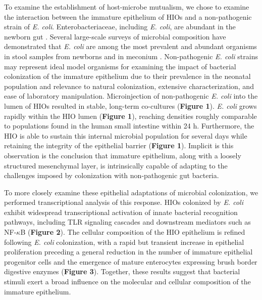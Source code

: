 \documentclass[9pt,lineo]{elife}
\begin{document}
To examine the establishment of host-microbe mutualism, we chose to examine the interaction between the immature epithelium of HIOs and a non-pathogenic strain of \emph{E. coli}. Enterobacteriaceae, including \emph{E. coli}, are abundant in the newborn gut \citep{Palmer:2007,Koenig:2011,Backhed:2015,Yassour:2016}. Several large-scale surveys of microbial composition have demonstrated that \emph{E. coli} are among the most prevalent and abundant organisms in stool samples from newborns \citep{Backhed:2015,Koenig:2011} and in meconium \citep{Gosalbes:2013}. Non-pathogenic \emph{E. coli} strains may represent ideal model organisms for examining the impact of bacterial colonization of the immature epithelium due to their prevalence in the neonatal population and relevance to natural colonization, extensive characterization, and ease of laboratory manipulation. Microinjection of non-pathogenic \emph{E. coli} into the lumen of HIOs resulted in stable, long-term co-cultures (\textbf{Figure 1}). \emph{E. coli} grows rapidly within the HIO lumen (\textbf{Figure 1}), reaching densities roughly comparable to populations found in the human small intestine \citep{Donaldson:2016} within 24 h. Furthermore, the HIO is able to sustain this internal microbial population for several days while retaining the integrity of the epithelial barrier (\textbf{Figure 1}). Implicit is this observation is the conclusion that immature epithelium, along with a loosely structured mesenchymal layer, is intrinsically capable of adapting to the challenges imposed by colonization with non-pathogenic gut bacteria. 

To more closely examine these epithelial adaptations of microbial colonization, we performed transcriptional analysis of this response. HIOs colonized by \emph{E. coli} exhibit widespread transcriptional activation of innate bacterial recognition pathways, including TLR signaling cascades and downstream mediators such as NF-\(\kappa\)B (\textbf{Figure 2}). The cellular composition of the HIO epithelium is refined following \emph{E. coli} colonization, with a rapid but transient increase in epithelial proliferation preceding a general reduction in the number of immature epithelial progenitor cells and the emergence of mature enterocytes expressing brush border digestive enzymes (\textbf{Figure 3}). Together, these results suggest that bacterial stimuli exert a broad influence on the molecular and cellular composition of the immature epithelium.
\end{document}
